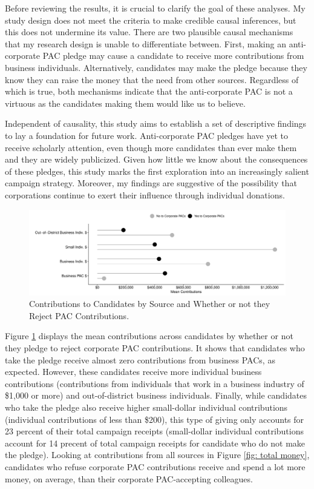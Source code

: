 \documentclass[12pt]{article}
\begin{document}
Before reviewing the results, it is crucial to clarify the goal of these analyses. My study design does not meet the criteria to make credible causal inferences, but this does not undermine its value. There are two plausible causal mechanisms that my research design is unable to differentiate between. First, making an anti-corporate PAC pledge may cause a candidate to receive more contributions from business individuals. Alternatively, candidates may make the pledge because they know they can raise the money that the need from other sources. Regardless of which is true, both mechanisms indicate that the anti-corporate PAC is not a virtuous as the candidates making them would like us to believe. 

Independent of causality, this study aims to establish a set of descriptive findings to lay a foundation for future work. Anti-corporate PAC pledges have yet to receive scholarly attention, even though more candidates than ever make them and they are widely publicized. Given how little we know about the consequences of these pledges, this study marks the first exploration into an increasingly salient campaign strategy. Moreover, my findings are suggestive of the possibility that corporations continue to exert their influence through individual donations.

\begin{figure}[!ht]
    \centering
    \includegraphics[width=0.9\linewidth]{all_candy.pdf}
    \caption{Contributions to Candidates by Source and Whether or not they Reject PAC Contributions.}
    \label{fig: all contribs}
\end{figure}

Figure \ref{fig: all contribs} displays the mean contributions across candidates by whether or not they pledge to reject corporate PAC contributions. It shows that candidates who take the pledge receive almost zero contributions from business PACs, as expected. However, these candidates receive more individual business contributions (contributions from individuals that work in a business industry of \$1,000 or more) and out-of-district business individuals.  Finally, while candidates who take the pledge also receive higher small-dollar individual contributions (individual contributions of less than \$200), this type of giving only accounts for 23 percent of their total campaign receipts (small-dollar individual contributions account for 14 precent of total campaign receipts for candidate who do not make the pledge). Looking at contributions from all sources in Figure \ref{fig: total money}, candidates who refuse corporate PAC contributions receive and spend a lot more money, on average, than their corporate PAC-accepting colleagues. 
\end{document}
